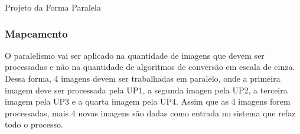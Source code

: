 \begin{subsection}{Projeto da Forma Paralela}
\subsubsection{Mapeamento}

O paralelismo vai ser aplicado na quantidade de imagens que devem ser
processadas e não na quantidade de algoritmos de conversão em escala de cinza.
Dessa forma, 4 imagens devem ser trabalhadas em paralelo, onde a primeira imagem
deve ser processada pela UP1, a segunda imagen pela UP2, a terceira imagem pela
UP3 e a quarta imagem pela UP4. Assim que as 4 imagens forem processadas, mais
4 novas imagens são dadas como entrada no sistema que refaz todo o processo.


\end{subsection}




